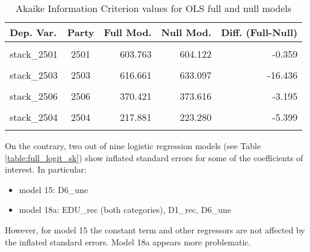 \documentclass[
]{article}
\providecommand{\tightlist}{%
  \setlength{\itemsep}{0pt}\setlength{\parskip}{0pt}}
\begin{document}
\begin{table}[!h]

\caption{\label{tab:unnamed-chunk-156}Akaike Information Criterion values for OLS full and null models 
        \label{table:ols_aic_sk}}
\centering
\begin{tabular}[t]{lcrrr}
\toprule
Dep. Var. & Party & Full Mod. & Null Mod. & Diff. (Full-Null)\\
\midrule
\cellcolor{gray!6}{stack\_2510} & \cellcolor{gray!6}{2510} & \cellcolor{gray!6}{122.988} & \cellcolor{gray!6}{249.895} & \cellcolor{gray!6}{-126.907}\\
stack\_2501 & 2501 & 603.763 & 604.122 & -0.359\\
\cellcolor{gray!6}{stack\_2509} & \cellcolor{gray!6}{2509} & \cellcolor{gray!6}{337.752} & \cellcolor{gray!6}{363.837} & \cellcolor{gray!6}{-26.085}\\
stack\_2503 & 2503 & 616.661 & 633.097 & -16.436\\
\cellcolor{gray!6}{stack\_2505} & \cellcolor{gray!6}{2505} & \cellcolor{gray!6}{404.605} & \cellcolor{gray!6}{403.405} & \cellcolor{gray!6}{1.200}\\
\addlinespace
stack\_2506 & 2506 & 370.421 & 373.616 & -3.195\\
\cellcolor{gray!6}{stack\_2508} & \cellcolor{gray!6}{2508} & \cellcolor{gray!6}{615.166} & \cellcolor{gray!6}{627.328} & \cellcolor{gray!6}{-12.162}\\
stack\_2504 & 2504 & 217.881 & 223.280 & -5.399\\
\cellcolor{gray!6}{stack\_2507} & \cellcolor{gray!6}{2507} & \cellcolor{gray!6}{-159.866} & \cellcolor{gray!6}{-157.311} & \cellcolor{gray!6}{-2.555}\\
\bottomrule
\end{tabular}
\end{table}

On the contrary, two out of nine logistic regression models (see Table \ref{table:full_logit_sk}) show
inflated standard errors for some of the coefficients of interest. In particular:

\begin{itemize}
\tightlist
\item
  model 15: D6\_une
\item
  model 18a: EDU\_rec (both categories), D1\_rec, D6\_une
\end{itemize}

However, for model 15 the constant term and other regressors are not affected by the inflated standard errors. Model 18a appears more problematic.
\end{document}
